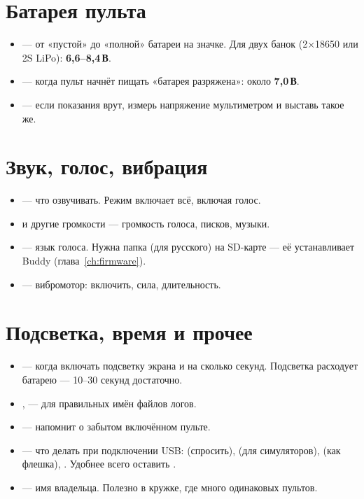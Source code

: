 \section{Батарея пульта}

\begin{center}
\end{center}

\begin{itemize}
  \item {} --- от «пустой» до «полной» батареи на значке. Для двух банок
        (2×18650 или 2S LiPo): \textbf{6,6--8,4\,В}.
  \item {} --- когда пульт начнёт пищать «батарея разряжена»:
        около \textbf{7,0\,В}.
  \item {} --- если показания врут, измерь напряжение мультиметром и
        выставь такое же.
\end{itemize}

\section{Звук, голос, вибрация}

\begin{itemize}
  \item {} --- что озвучивать. Режим  включает всё, включая голос.
  \item {} и другие громкости --- громкость голоса, писков, музыки.
  \item {} --- язык голоса. Нужна папка  (для русского)
        на SD-карте --- её устанавливает Buddy (глава~\ref{ch:firmware}).
  \item {} --- вибромотор: включить, сила, длительность.
\end{itemize}

\section{Подсветка, время и прочее}

\begin{itemize}
  \item {} --- когда включать подсветку экрана и на сколько секунд.
        Подсветка расходует батарею --- 10--30 секунд достаточно.
  \item {},  --- для правильных имён файлов логов.
  \item {} --- напомнит о забытом включённом пульте.
  \item {} --- что делать при подключении USB:  (спросить),
         (для симуляторов),  (как флешка), .
        Удобнее всего оставить .
  \item {} --- имя владельца. Полезно в кружке, где много одинаковых пультов.
\end{itemize}

